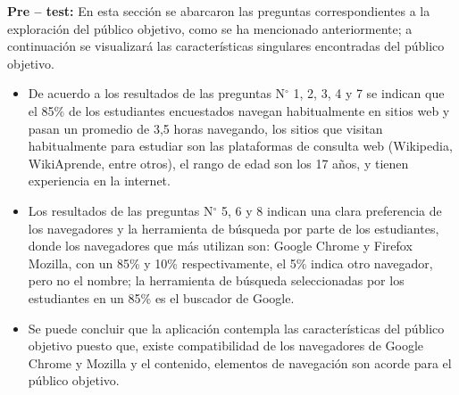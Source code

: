 \textbf{Pre – test:} En esta sección se abarcaron las preguntas correspondientes a la exploración del público objetivo, como se ha mencionado anteriormente; a continuación se visualizará las características singulares encontradas del público objetivo.
\begin{itemize}
    \item De acuerdo a los resultados de las preguntas N$^{\circ}$ 1, 2, 3, 4 y 7 se indican que el 85\% de los estudiantes encuestados navegan habitualmente en sitios web y pasan un promedio de 3,5 horas navegando, los sitios que visitan habitualmente para estudiar son las plataformas de consulta web (Wikipedia, WikiAprende, entre otros), el rango de edad son los 17 años, y tienen experiencia en la internet. 
    
    \item Los resultados de las preguntas N$^{\circ}$ 5, 6 y 8 indican una clara preferencia de los navegadores y la herramienta de búsqueda por parte de los estudiantes, donde los navegadores que más utilizan son: Google Chrome y Firefox Mozilla, con un 85\% y 10\% respectivamente, el 5\% indica otro navegador, pero no el nombre; la herramienta de búsqueda seleccionadas por los estudiantes en un 85\% es el buscador de Google. 
    
    \item Se puede concluir que la aplicación contempla las características del público objetivo puesto que, existe compatibilidad de los navegadores de Google Chrome y Mozilla y el contenido, elementos de navegación son acorde para el público objetivo.
    
\end{itemize}

